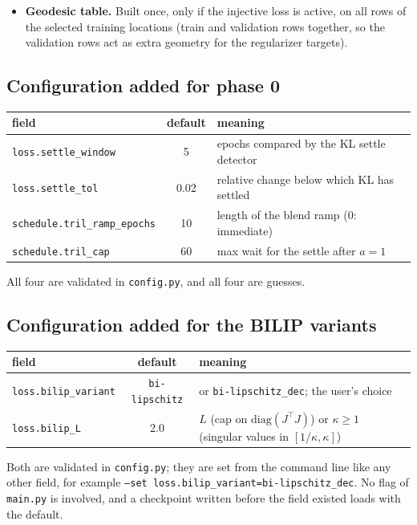 \begin{itemize}[leftmargin=1.5em]
      finalized \texttt{RunConfig}, the trainer configuration and the input
      arguments. \texttt{--resume} restores everything and continues from the next
      epoch, using the saved arguments and \texttt{RunConfig}; only \texttt{--device}
      and new \texttt{--set} overrides come from the command line. Older checkpoints
      without the blend state still load.
\item \textbf{Geodesic table.} Built once, only if the injective loss is active, on all
      rows of the selected training locations (train and validation rows together, so
      the validation rows act as extra geometry for the regularizer targets).
\end{itemize}

\subsection{Configuration added for phase 0}
\label{sec:schedule:newcfg}
\begin{center}
\begin{tabular}{@{}lcl@{}}
\toprule
field & default & meaning\\
\midrule
\texttt{loss.settle\_window} & 5 & epochs compared by the KL settle detector\\
\texttt{loss.settle\_tol} & 0.02 & relative change below which KL has settled\\
\texttt{schedule.tril\_ramp\_epochs} & 10 & length of the blend ramp (0: immediate)\\
\texttt{schedule.tril\_cap} & 60 & max wait for the settle after $a=1$\\
\bottomrule
\end{tabular}
\end{center}
All four are validated in \texttt{config.py}, and all four are guesses.

\subsection{Configuration added for the BILIP variants}
\label{sec:schedule:bilipcfg}
\begin{center}
\begin{tabular}{@{}lcl@{}}
\toprule
field & default & meaning\\
\midrule
\texttt{loss.bilip\_variant} & \texttt{bi-lipschitz} & or \texttt{bi-lipschitz\_dec}; the
user's choice\\
\texttt{loss.bilip\_L} & 2.0 & $L$ (cap on $\mathrm{diag}(J^\top J)$) or $\kappa\ge1\ $
(singular values in $[1/\kappa,\kappa]$)\\
\bottomrule
\end{tabular}
\end{center}
Both are validated in \texttt{config.py}; they are set from the command line like any
other field, for example \texttt{--set loss.bilip\_variant=bi-lipschitz\_dec}. No flag of
\texttt{main.py} is involved, and a checkpoint written before the field existed loads
with the default.

